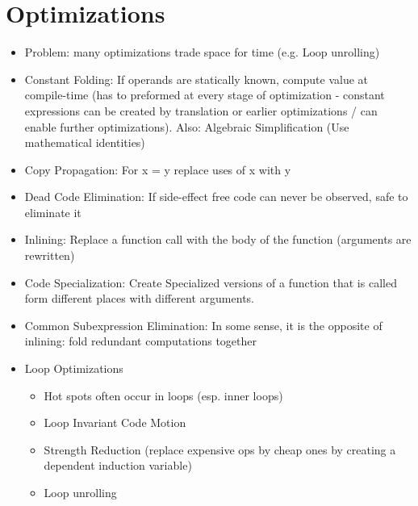 \section*{Optimizations}
\begin{itemize}
	\item Problem: many optimizations trade space for time (e.g. Loop unrolling)
	\item Constant Folding: If operands are statically known, compute value at compile-time (has to preformed at every stage of optimization - constant expressions can be created by translation or earlier optimizations / can enable further optimizations). Also: Algebraic Simplification (Use mathematical identities)
	\item Copy Propagation: For x = y replace uses of x with y
	\item Dead Code Elimination: If side-effect free code can never be observed, safe to eliminate it
	\item Inlining: Replace a function call with the body of the function (arguments are rewritten)
	\item Code Specialization: Create Specialized versions of a function that is called form different places with different arguments.
	\item Common Subexpression Elimination: In some sense, it is the opposite of inlining: fold redundant computations together
	\item Loop Optimizations
	\begin{itemize}
		\item Hot spots often occur in loops (esp. inner loops)
		\item Loop Invariant Code Motion
		\item Strength Reduction (replace expensive ops by cheap ones by creating a dependent induction variable)
		\item Loop unrolling
	\end{itemize}
\end{itemize}


